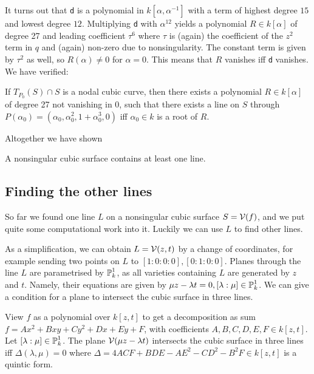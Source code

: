It turns out that \verb|d| is a polynomial in $k[\alpha,\alpha^{-1}]$ with a term of highest degree $15$ and lowest degree $12$.
Multiplying \verb|d| with $\alpha^{12}$ yields a polynomial $R\in k[\alpha]$ of degree 27 and leading coefficient $\tau^6$ where $\tau$ is (again) the coefficient of the $z^2$ term in $q$ and (again) non-zero due to nonsingularity.
The constant term is given by $\tau^2$ as well, so $R(\alpha) \neq 0$ for $\alpha = 0$. This means that $R$ vanishes iff \verb|d| vanishes.
We have verified:
\begin{proposition} \label{propositionExists2}
If $T_{P_0}(S) \cap S$ is a nodal cubic curve, then there exists a polynomial $R \in k[\alpha]$ of degree 27 not vanishing in 0, such that there exists a line on $S$ through $P(\alpha_0) = (\alpha_0,\alpha_0^2,1+\alpha_0^3,0)$ iff $\alpha_0 \in k$ is a root of $R$.
\end{proposition}

Altogether we have shown
\begin{theorem}
A nonsingular cubic surface contains at least one line.
\end{theorem}

\subsection{Finding the other lines}

So far we found one line $L$ on a nonsingular cubic surface $S = \operatorname{\mathcal V}(f)$, and we put quite some computational work into it.
Luckily we can use $L$ to find other lines.

As a simplification, we can obtain $L=\operatorname{\mathcal V}(z,t)$ by a change of coordinates, for example sending two points on $L$ to $[1:0:0:0],[0:1:0:0]$.
Planes through the line $L$ are parametrised by $\operatorname{\mathbb P}^1_k$, as all varieties containing $L$ are generated by $z$ and $t$.
Namely, their equations are given by $\mu z - \lambda t = 0, [\lambda:\mu] \in \operatorname{\mathbb P}^1_k$.
We can give a condition for a plane to intersect the cubic surface in three lines.

\begin{lemma} \label{lemmaDelta}
View $f$ as a polynomial over $k[z,t]$ to get a decomposition as sum $f = Ax^2 + Bxy + Cy^2 + Dx + Ey + F$, with coefficients $A,B,C,D,E,F \in k[z,t]$.
Let $[\lambda:\mu] \in \operatorname{\mathbb P}^1_k$.
The plane $\operatorname{\mathcal V}(\mu z - \lambda t)$ intersects the cubic surface in three lines iff
$\Delta(\lambda,\mu) = 0$ where $\Delta = 4ACF + BDE - AE^2 - CD^2 - B^2F \in k[z,t]$ is a quintic form.
\end{lemma}


